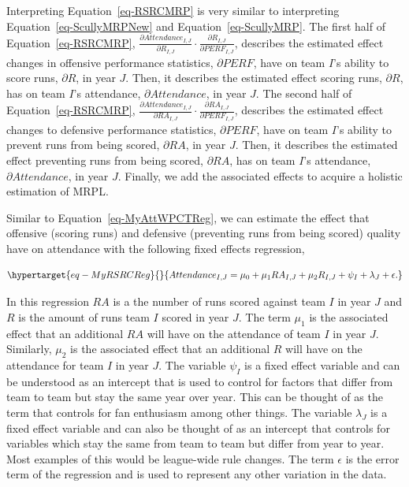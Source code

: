 \documentclass[
  12pt,
  letterpaper,
  DIV=11,
  numbers=noendperiod]{scrartcl}
\begin{document}
Interpreting Equation~\ref{eq-RSRCMRP} is very similar to interpreting
Equation~\ref{eq-ScullyMRPNew} and Equation~\ref{eq-ScullyMRP}. The
first half of Equation~\ref{eq-RSRCMRP},
\(\frac{\partial Attendance_{I,J}}{\partial R_{I,J}}\cdot\frac{\partial R_{I,J}}{\partial PERF_{I,J}}\),
describes the estimated effect changes in offensive performance
statistics, \(\partial PERF\), have on team \(I\)'s ability to score
runs, \(\partial R\), in year \(J\). Then, it describes the estimated
effect scoring runs, \(\partial R\), has on team \(I\)'s attendance,
\(\partial Attendance\), in year \(J\). The second half of
Equation~\ref{eq-RSRCMRP},
\(\frac{\partial Attendance_{I,J}}{\partial RA_{I,J}}\cdot\frac{\partial RA_{I,J}}{\partial PERF_{I,J}}\),
describes the estimated effect changes to defensive performance
statistics, \(\partial PERF\), have on team \(I\)'s ability to prevent
runs from being scored, \(\partial RA\), in year \(J\). Then, it
describes the estimated effect preventing runs from being scored,
\(\partial RA\), has on team \(I\)'s attendance,
\(\partial Attendance\), in year \(J\). Finally, we add the associated
effects to acquire a holistic estimation of MRPL.

Similar to Equation~\ref{eq-MyAttWPCTReg}, we can estimate the effect
that offensive (scoring runs) and defensive (preventing runs from being
scored) quality have on attendance with the following fixed effects
regression,

\begin{equation}\protect\hypertarget{eq-MyRSRCReg}{}{
Attendance_{I,J}=\mu_0+\mu_1RA_{I,J}+\mu_2R_{I,J}+\psi_I+\lambda_J+\epsilon.
}\label{eq-MyRSRCReg}\end{equation}

In this regression \(RA\) is a the number of runs scored against team
\(I\) in year \(J\) and \(R\) is the amount of runs team \(I\) scored in
year \(J\). The term \(\mu_1\) is the associated effect that an
additional \(RA\) will have on the attendance of team \(I\) in year
\(J\). Similarly, \(\mu_2\) is the associated effect that an additional
\(R\) will have on the attendance for team \(I\) in year \(J\). The
variable \(\psi_I\) is a fixed effect variable and can be understood as
an intercept that is used to control for factors that differ from team
to team but stay the same year over year. This can be thought of as the
term that controls for fan enthusiasm among other things. The variable
\(\lambda_J\) is a fixed effect variable and can also be thought of as
an intercept that controls for variables which stay the same from team
to team but differ from year to year. Most examples of this would be
league-wide rule changes. The term \(\epsilon\) is the error term of the
regression and is used to represent any other variation in the data.
\end{document}
